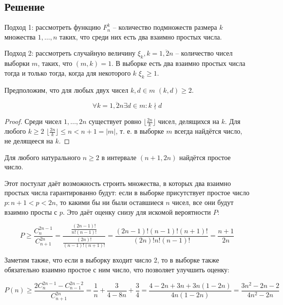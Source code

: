 \documentclass[11pt]{article}
\newcounter{lem}\setcounter{lem}{0}
\def\lm{\par\smallskip\refstepcounter{lem}\textbf{\arabic{lem}}}
\newtheorem*{Lemma}{Лемма \lm}
\newcounter{th}\setcounter{th}{0}
\def\th{\par\smallskip\refstepcounter{th}\textbf{\arabic{th}}}
\newtheorem*{Theorem}{Теорема \th}
\begin{document}
\subsection{Решение}
\label{sec:org822e847}
Подход 1: рассмотреть функцию \(F^k_n\) -- количество подмножеств размера \(k\) множества \(1, \ldots, n\) таких, что среди них есть два взаимно простых числа.

Подход 2: рассмотреть случайную величину \(\xi_k, k = \overline{1, 2n}\) -- количество чисел выборки \(m\), таких, что \((m, k) = 1\). В выборке есть два взаимно простых числа тогда и только тогда, когда для некоторого \(k\) \(\xi_k \geq 1\).

Предположим, что для любых двух чисел \(k, d \in m\) \((k, d) \geq 2\).

\begin{Lemma}
\begin{equation*}
\forall k = \overline{1, 2n} \exists d \in m: k\nmid d
\end{equation*}
\end{Lemma}
\begin{proof}
Среди чисел $1, \ldots, 2n$ существует ровно $\lfloor\frac{2n}k\rfloor$ чисел, делящихся на $k$. Для любого $k \geq 2$ $\lfloor\frac{2n}k\rfloor \leq n < n + 1 = |m|$, т. е. в выборке $m$ всегда найдётся число, не делящееся на $k$.
\end{proof}
\begin{Lemma}\label{lem:Bertran}
Для любого натурального $n \geq 2$ в интервале $(n + 1, 2n)$ найдётся простое число.
\end{Lemma}
Этот постулат даёт возможность строить множества, в которых два взаимно простых числа гарантированно будут: если в выборке присутствует простое число $p: n + 1 < p < 2n$, то какими бы ни были оставшиеся $n$ чисел, все они будут взаимно просты с $p$. Это даёт оценку снизу для искомой вероятности $P$:
\begin{Theorem}
\begin{equation}
P \geq \frac{C^{2n - 1}_n}{C^{2n}_{n + 1}} = \frac{\frac{(2n - 1)!}{n!(n - 1)!}}{\frac{(2n)!}{(n - 1)!(n + 1)!}} = \frac{(2n - 1)!(n - 1)!(n + 1)!}{(2n)!n!(n - 1)!} = \frac{n + 1}{2n}
\end{equation}
\end{Theorem}
Заметим также, что если в выборку входит число $2$, то в выборке также обязательно взаимно простое с ним число, что позволяет улучшить оценку:
\begin{Theorem}
\begin{equation}
P(n) \geq \frac{2C^{2n - 1}_n - C^{2n - 2}_{n - 1}}{C^{2n}_{n + 1}} = \frac1n + \frac3{4 - 8n} + \frac34 = \frac{4 - 2n + 3n + 3n(1 - 2n)}{4n(1 - 2n)} = \frac{3n^2 - 2n - 2}{4n^2 - 2n}
\end{equation}
\end{Theorem}
\pagebreak
\end{document}
